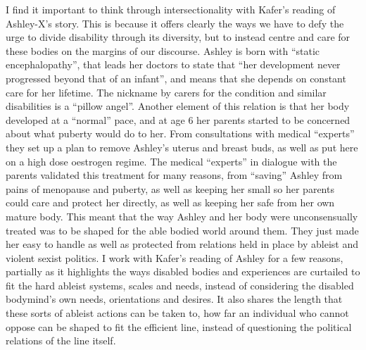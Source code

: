 I find it important to think through intersectionality with Kafer's
reading of Ashley-X's story. This is because it offers clearly the ways
we have to defy the urge to divide disability through its diversity, but
to instead centre and care for these bodies on the margins of our
discourse. Ashley is born with ``static encephalopathy'', that leads her
doctors to state that ``her development never progressed beyond that of
an infant'', and means that she depends on constant care for her
lifetime. The nickname by carers for the condition and similar
disabilities is a ``pillow angel''. Another element of this relation is
that her body developed at a ``normal'' pace, and at age 6 her parents
started to be concerned about what puberty would do to her. From
consultations with medical ``experts'' they set up a plan to remove
Ashley's uterus and breast buds, as well as put here on a high dose
oestrogen regime. The medical ``experts'' in dialogue with the parents
validated this treatment for many reasons, from ``saving'' Ashley from
pains of menopause and puberty, as well as keeping her small so her
parents could care and protect her directly, as well as keeping her safe
from her own mature body. This meant that the way Ashley and her body
were unconsensually treated was to be shaped for the able bodied world
around them. They just made her easy to handle as well as protected from
relations held in place by ableist and violent sexist politics. I work
with Kafer's reading of Ashley for a few reasons, partially as it
highlights the ways disabled bodies and experiences are curtailed to fit
the hard ableist systems, scales and needs, instead of considering the
disabled bodymind's own needs, orientations and desires. It also shares
the length that these sorts of ableist actions can be taken to, how far
an individual who cannot oppose can be shaped to fit the efficient line,
instead of questioning the political relations of the line itself.

